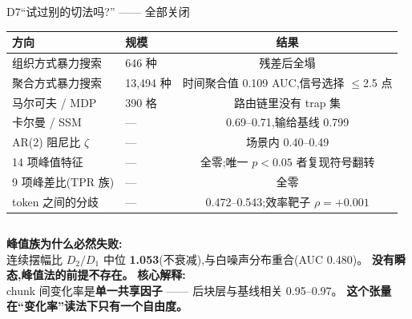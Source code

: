\documentclass[aspectratio=169,10pt]{beamer}
\newcommand{\hi}[1]{{\color{teal}\bfseries #1}}
\newcommand{\bad}[1]{{\color{brick}\bfseries #1}}
\begin{document}
\begin{frame}{D7\quad “试过别的切法吗?” —— 全部关闭}
  \footnotesize
  \begin{center}
  \begin{tabular}{@{}llc@{}}
    \toprule
    \textbf{方向} & \textbf{规模} & \textbf{结果} \\ \midrule
    组织方式暴力搜索 & 646 种 & 残差后全塌 \\
    聚合方式暴力搜索 & 13{,}494 种 & 时间聚合值 0.109 AUC,信号选择 $\le$2.5 点 \\
    马尔可夫 / MDP & 390 格 & 路由链里没有 trap 集 \\
    卡尔曼 / SSM & --- & 0.69--0.71,输给基线 0.799 \\
    AR(2) 阻尼比 $\zeta$ & --- & 场景内 0.40--0.49 \\
    14 项峰值特征 & --- & 全零;唯一 $p<0.05$ 者复现符号翻转 \\
    9 项峰差比(TPR 族) & --- & 全零 \\
    token 之间的分歧 & --- & 0.472--0.543;效率靶子 $\rho=+0.001$ \\ \bottomrule
  \end{tabular}
  \end{center}
  \vfill
  \begin{columns}[T]
      \textbf{峰值族为什么必然失败:}\\
      连续摆幅比 $D_2/D_1$ 中位 \bad{1.053}(不衰减),与白噪声分布重合(AUC 0.480)。
      \textbf{没有瞬态,峰值法的前提不存在。}
      \textbf{核心解释:}\\
      chunk 间变化率是\hi{单一共享因子} —— 后块层与基线相关 0.95--0.97。
      \textbf{这个张量在“变化率”读法下只有一个自由度。}
  \end{columns}
\end{frame}
\end{document}
